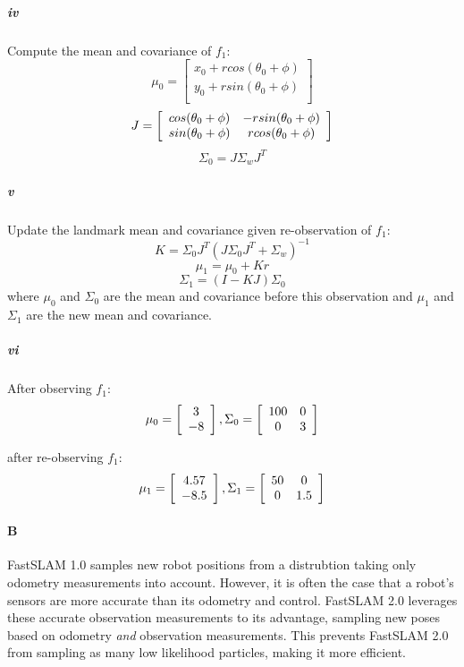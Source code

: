 \documentclass[12pt]{article}
\begin{document}
\subparagraph{iv} Compute the mean and covariance of $f_1$:
$$\mu_0 = \left[ \begin{array}{c}
x_0 + rcos(\theta_0 + \phi) \\
y_0 + rsin(\theta_0 + \phi) \\
\end{array}\right]$$
$$J =  \left[ \begin{array}{c c}
cos(\theta_0 + \phi) & -rsin(\theta_0 + \phi)\\
sin(\theta_0 + \phi) & rcos(\theta_0 + \phi)\\
\end{array}\right]$$
$$\Sigma_0 = J \Sigma_w J^T$$

\subparagraph{v} Update the landmark mean and covariance given re-observation of $f_1$:
$$K = \Sigma_0J^T\left(J\Sigma_0J^T + \Sigma_w\right)^{-1}$$
$$\mu_1 = \mu_0 + Kr$$
$$\Sigma_1 = (I-KJ)\Sigma_0$$
where $\mu_0$ and $\Sigma_0$ are the mean and covariance before this observation and $\mu_1$ and $\Sigma_1$ are the new mean and covariance.

\subparagraph{vi}
After observing $f_1$: \\
$$\mu_0 = \left[ \begin{array}{c}
3 \\
-8
\end{array}\right],
\Sigma_0 = \left[ \begin{array}{c c}
100 & 0 \\
0 & 3
\end{array}\right]$$

after re-observing $f_1$:
$$\mu_1 = \left[ \begin{array}{c}
4.57 \\
-8.5
\end{array}\right],
\Sigma_1 = \left[ \begin{array}{c c c c c c c}
50 & 0 \\
0 & 1.5
\end{array}\right]$$

\paragraph{B}
FastSLAM 1.0 samples new robot positions from a distrubtion taking only
odometry measurements into account. However, it is often the case that
a robot's sensors are more accurate than its odometry and control. FastSLAM 2.0
leverages these accurate observation measurements to its advantage, sampling
new poses based on odometry \emph{and} observation measurements. This prevents
FastSLAM 2.0 from sampling as many low likelihood particles, making it more
efficient.
\end{document}
